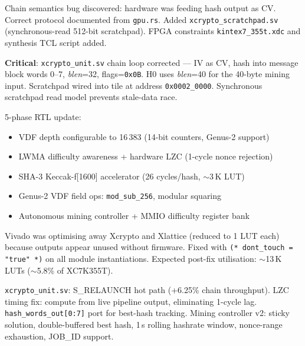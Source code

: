 \documentclass[11pt,a4paper]{article}
\begin{document}
\begin{commitbox}
Chain semantics bug discovered: hardware was feeding hash output as CV.
Correct protocol documented from \texttt{gpu.rs}.
Added \texttt{xcrypto\_scratchpad.sv} (synchronous-read 512-bit scratchpad).
FPGA constraints \texttt{kintex7\_355t.xdc} and synthesis TCL script added.
\end{commitbox}

\begin{commitbox}
\textbf{Critical}: \texttt{xcrypto\_unit.sv} chain loop corrected --- IV as CV, hash into
message block words 0--7, \textit{blen}=32, flags=\texttt{0x0B}.
H0 uses \textit{blen}=40 for the 40-byte mining input.
Scratchpad wired into tile at address \texttt{0x0002\_0000}.
Synchronous scratchpad read model prevents stale-data race.
\end{commitbox}

\begin{commitbox}
5-phase RTL update:
\begin{itemize}[noitemsep]
  \item VDF depth configurable to 16\,383 (14-bit counters, Genus-2 support)
  \item LWMA difficulty awareness + hardware LZC (1-cycle nonce rejection)
  \item SHA-3 Keccak-f[1600] accelerator (26 cycles/hash, $\sim$3\,K LUT)
  \item Genus-2 VDF field ops: \texttt{mod\_sub\_256}, modular squaring
  \item Autonomous mining controller + MMIO difficulty register bank
\end{itemize}
\end{commitbox}

\begin{commitbox}
Vivado was optimising away Xcrypto and Xlattice (reduced to 1 LUT each)
because outputs appear unused without firmware. Fixed with
\texttt{(* dont\_touch = "true" *)} on all module instantiations.
Expected post-fix utilisation: $\sim$13\,K LUTs ($\sim$5.8\% of XC7K355T).
\end{commitbox}

\begin{commitbox}
\texttt{xcrypto\_unit.sv}: S\_RELAUNCH hot path (+6.25\% chain throughput).
LZC timing fix: compute from live pipeline output, eliminating 1-cycle lag.
\texttt{hash\_words\_out[0:7]} port for best-hash tracking.
Mining controller v2: sticky solution, double-buffered best hash, 1\,s
rolling hashrate window, nonce-range exhaustion, JOB\_ID support.
\end{commitbox}
\end{document}
